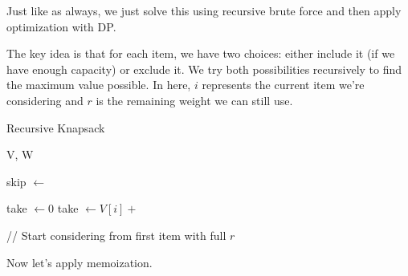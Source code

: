 \documentclass{article}
\begin{document}
    Just like as always, we just solve this using recursive brute force and then apply optimization with DP. 

    \begin{algo}
      The key idea is that for each item, we have two choices: either include it (if we have enough capacity) or exclude it. We try both possibilities recursively to find the maximum value possible. In here, $i$ represents the current item we're considering and $r$ is the remaining weight we can still use. 
      \begin{algorithm}[H]
        \caption{Recursive Knapsack}
        \label{alg:recknapG}
        \begin{algorithmic}
          \State V, W
              
              \State {}   
            \EndIf {}

            \State skip $\gets$   

            \State take $\gets 0$  
              
              \State take $\gets V[i] +$  
            \EndIf {}

            \State {} 
          \EndFunction
          
          \State // Start considering from first item with full $r$ 
          \State {}
        \end{algorithmic}
      \end{algorithm}
    \end{algo}

    Now let's apply memoization. 
\end{document}

